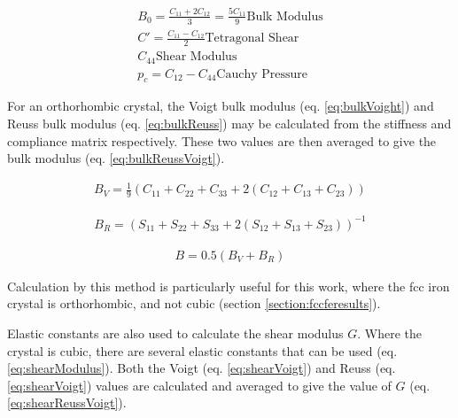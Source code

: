 \begin{equation}
\begin{split}
B_{0} = \frac{C_{11} + 2 C_{12}}{3} = \frac{5 C_{11}}{9} \text{Bulk Modulus} \\
C' = \frac{C_{11} - C_{12}}{2} \text{Tetragonal Shear} \\
C_{44} \text{Shear Modulus} \\
p_{c} = C_{12} - C_{44}  \text{Cauchy Pressure} 
\end{split}
\label{eq:cubicProperties}
\end{equation}


For an orthorhombic crystal, the Voigt bulk modulus (eq. \ref{eq:bulkVoight}) and Reuss bulk modulus (eq. \ref{eq:bulkReuss}) may be calculated from the stiffness and compliance matrix respectively.  These two values are then averaged to give the bulk modulus (eq. \ref{eq:bulkReussVoigt})\cite{dftrfkj}.

\begin{equation}
\begin{split}
B_{V} = \frac{1}{9} \left( C_{11} + C_{22} + C_{33} + 2(C_{12} + C_{13} + C_{23}) \right)
\end{split}
\label{eq:bulkVoight}
\end{equation}

\begin{equation}
\begin{split}
B_{R} = \left( S_{11} + S_{22} + S_{33} + 2(S_{12} + S_{13} + S_{23}) \right)^{-1}
\end{split}
\label{eq:bulkReuss}
\end{equation}

\begin{equation}
\begin{split}
B = 0.5(B_V + B_R)
\end{split}
\label{eq:bulkReussVoigt}
\end{equation}

Calculation by this method is particularly useful for this work, where the \acrshort{fcc} iron crystal is orthorhombic, and not cubic (section \ref{section:fccferesults}).

Elastic constants are also used to calculate the shear modulus $G$.  Where the crystal is cubic, there are several elastic constants that can be used (eq. \ref{eq:shearModulus})\cite{dftrfkj}.  Both the Voigt (eq. \ref{eq:shearVoigt}) and Reuss (eq. \ref{eq:shearVoigt}) values are calculated and averaged to give the value of $G$ (eq. \ref{eq:shearReussVoigt}).  

